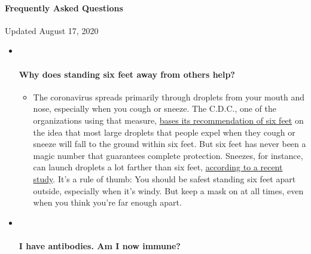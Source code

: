 \hypertarget{frequently-asked-questions}{%
\paragraph{Frequently Asked
Questions}\label{frequently-asked-questions}}

Updated August 17, 2020

\begin{itemize}
\item ~
  \hypertarget{why-does-standing-six-feet-away-from-others-help}{%
  \paragraph{Why does standing six feet away from others
  help?}\label{why-does-standing-six-feet-away-from-others-help}}

  \begin{itemize}
  \tightlist
  \item
    The coronavirus spreads primarily through droplets from your mouth
    and nose, especially when you cough or sneeze. The C.D.C., one of
    the organizations using that measure,
    \href{https://www.nytimes.com/2020/04/14/health/coronavirus-six-feet.html?action=click\&pgtype=Article\&state=default\&region=MAIN_CONTENT_3\&context=storylines_faq}{bases
    its recommendation of six feet} on the idea that most large droplets
    that people expel when they cough or sneeze will fall to the ground
    within six feet. But six feet has never been a magic number that
    guarantees complete protection. Sneezes, for instance, can launch
    droplets a lot farther than six feet,
    \href{https://jamanetwork.com/journals/jama/fullarticle/2763852}{according
    to a recent study}. It's a rule of thumb: You should be safest
    standing six feet apart outside, especially when it's windy. But
    keep a mask on at all times, even when you think you're far enough
    apart.
  \end{itemize}
\item ~
  \hypertarget{i-have-antibodies-am-i-now-immune}{%
  \paragraph{I have antibodies. Am I now
  immune?}\label{i-have-antibodies-am-i-now-immune}}


\end{itemize}
